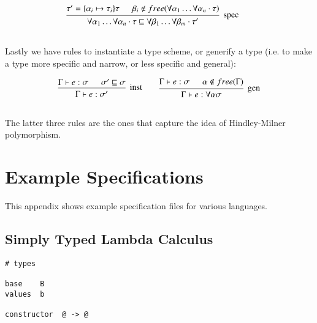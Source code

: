 \begin{appendices}
\[\begin{array}{c@{\qquad}c}  
    \mbox{\begin{prooftree}
      \hypo{\tau' = \{\alpha_i \mapsto \tau_i\}\tau}
      \hypo{\beta_i \notin free(\forall \alpha_1 \ldots \forall
        \alpha_n \cdot \tau)}
      \infer2[spec]{\forall \alpha_1 \ldots \forall \alpha_n \cdot
        \tau \sqsubseteq \forall \beta_1 \ldots \forall
        \beta_m \cdot \tau' }
    \end{prooftree}}
    \\\\
\end{array} \]  
  
Lastly we have rules to instantiate a type scheme, or generify a
type (i.e. to make a type more specific and narrow, or less specific
and general):

\[\begin{array}{c@{\qquad}c}  
    \mbox{\begin{prooftree}
      \hypo{\Gamma \vdash e : \sigma}
      \hypo{\sigma' \sqsubseteq \sigma}
      \infer2[inst]{\Gamma \vdash e : \sigma'}
    \end{prooftree}}
    &
    \mbox{\begin{prooftree}
      \hypo{\Gamma \vdash e : \sigma}
      \hypo{\alpha \notin free(\Gamma)}
      \infer2[gen]{\Gamma \vdash e : \forall \alpha \sigma}
    \end{prooftree}}
    \\\\
\end{array} \]

The latter three rules are the ones that capture the idea of
Hindley-Milner polymorphism.

\clearpage
\section{Example Specifications}
\label{appendix:examplespecifications}

This appendix shows example specification files for various
languages.

\subsection{Simply Typed Lambda Calculus}

\begin{verbatim}
# types

base    B
values  b

constructor  @ -> @


\end{verbatim}
\end{appendices}
